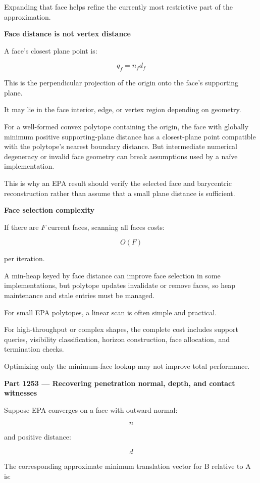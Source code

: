 Expanding that face helps refine the currently most restrictive part of the approximation.

\textbf{Face distance is not vertex distance}

A face's closest plane point is:

\[
\boxed{ q_f=n_fd_f }
\]

This is the perpendicular projection of the origin onto the face's supporting plane.

It may lie in the face interior, edge, or vertex region depending on geometry.

For a well-formed convex polytope containing the origin, the face with globally minimum positive supporting-plane distance has a closest-plane point compatible with the polytope's nearest boundary distance. But intermediate numerical degeneracy or invalid face geometry can break assumptions used by a naïve implementation.

This is why an EPA result should verify the selected face and barycentric reconstruction rather than assume that a small plane distance is sufficient.

\textbf{Face selection complexity}

If there are \(F\) current faces, scanning all faces costs:

\[
O(F)
\]

per iteration.

A min-heap keyed by face distance can improve face selection in some implementations, but polytope updates invalidate or remove faces, so heap maintenance and stale entries must be managed.

For small EPA polytopes, a linear scan is often simple and practical.

For high-throughput or complex shapes, the complete cost includes support queries, visibility classification, horizon construction, face allocation, and termination checks.

Optimizing only the minimum-face lookup may not improve total performance.

\textbf{Part 1253 --- Recovering penetration normal, depth, and contact witnesses}

Suppose EPA converges on a face with outward normal:

\[
n
\]

and positive distance:

\[
d
\]

The corresponding approximate minimum translation vector for B relative to A is:

